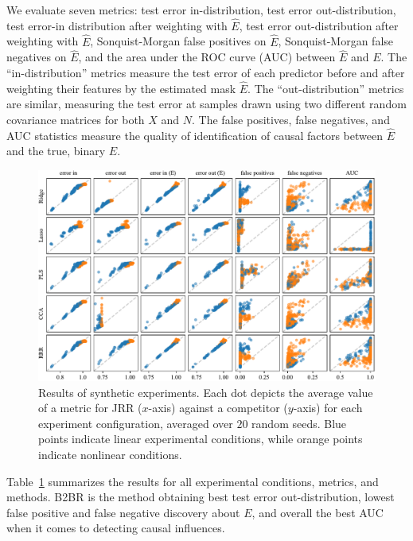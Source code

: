 We evaluate seven metrics: 
%
test error in-distribution, test error out-distribution, test error-in distribution after weighting with $\hat{E}$, test error out-distribution after weighting with $\hat{E}$, Sonquist-Morgan false positives on $\hat{E}$, Sonquist-Morgan false negatives on $\hat{E}$, and the area under the ROC curve (AUC) between $\hat{E}$ and $E$.
%
The ``in-distribution'' metrics measure the test error of each predictor before and after weighting their features by the estimated mask $\hat{E}$.
%
The ``out-distribution'' metrics are similar, measuring the test error at samples drawn using two different random covariance matrices for both $X$ and $N$.
%
The false positives, false negatives, and AUC statistics measure the quality of identification of causal factors between $\hat{E}$ and the true, binary $E$. 

\begin{figure}[htpb]
    \centering
    \includegraphics[width=\textwidth]{synthetic.pdf}
    \caption{Results of synthetic experiments. Each dot depicts the average value of a metric for JRR ($x$-axis) against a competitor ($y$-axis) for each experiment configuration, averaged over $20$ random seeds.
    Blue points indicate linear experimental conditions, while orange points indicate nonlinear conditions.}
    \label{table:synthetic}
\end{figure}

Table~\ref{table:synthetic} summarizes the results for all experimental conditions, metrics, and methods.
%
B2BR is the method obtaining best test error out-distribution, lowest false positive and false negative discovery about $E$, and overall the best AUC when it comes to detecting causal influences.

